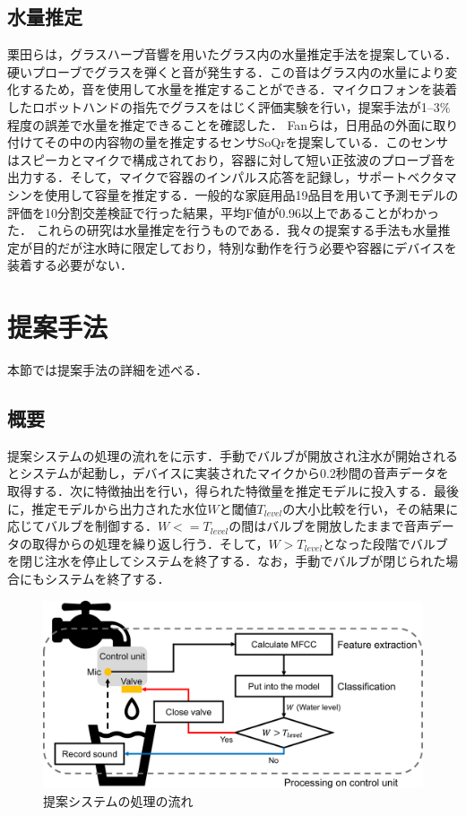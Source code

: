 \documentclass[submit,techrep,noauthor]{ipsj}
\begin{document}
\subsection{水量推定}
栗田ら\cite{GlassHarp}は，グラスハープ音響を用いたグラス内の水量推定手法を提案している．硬いプローブでグラスを弾くと音が発生する．この音はグラス内の水量により変化するため，音を使用して水量を推定することができる．マイクロフォンを装着したロボットハンドの指先でグラスをはじく評価実験を行い，提案手法が1--3\%程度の誤差で水量を推定できることを確認した．
Fanら\cite{SoQr}は，日用品の外面に取り付けてその中の内容物の量を推定するセンサSoQrを提案している．このセンサはスピーカとマイクで構成されており，容器に対して短い正弦波のプローブ音を出力する．そして，マイクで容器のインパルス応答を記録し，サポートベクタマシンを使用して容量を推定する．一般的な家庭用品19品目を用いて予測モデルの評価を10分割交差検証で行った結果，平均F値が0.96以上であることがわかった．
これらの研究は水量推定を行うものである．我々の提案する手法も水量推定が目的だが注水時に限定しており，特別な動作を行う必要や容器にデバイスを装着する必要がない．

\section{提案手法}
\label{sec:method}
本節では提案手法の詳細を述べる．

\subsection{概要}
提案システムの処理の流れをに示す．手動でバルブが開放され注水が開始されるとシステムが起動し，デバイスに実装されたマイクから0.2秒間の音声データを取得する．次に特徴抽出を行い，得られた特徴量を推定モデルに投入する．最後に，推定モデルから出力された水位$W$と閾値$T_{level}$の大小比較を行い，その結果に応じてバルブを制御する．$W<=T_{level}$の間はバルブを開放したままで音声データの取得からの処理を繰り返し行う．そして，$W>T_{level}$となった段階でバルブを閉じ注水を停止してシステムを終了する．なお，手動でバルブが閉じられた場合にもシステムを終了する．

\begin{figure}[!t]
  \centering
  \includegraphics[width=1\linewidth]{figures/method.eps}
  \caption{提案システムの処理の流れ}
  \label{fig:method}
\end{figure}
\end{document}
